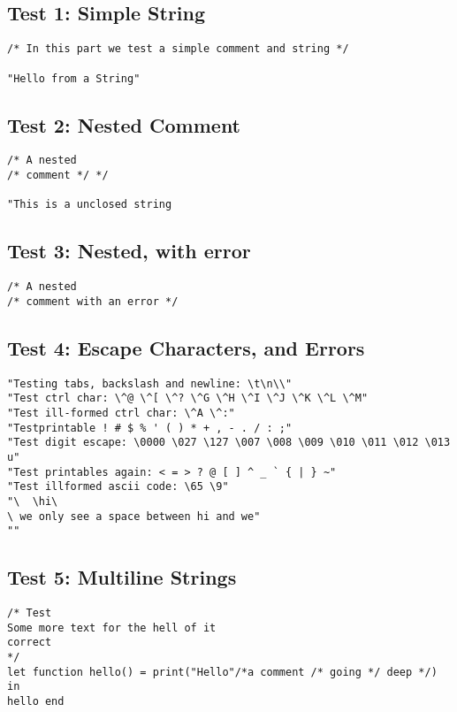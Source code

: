 \documentclass{article}
\begin{document}
\subsection{Test 1: Simple String}
\begin{lstlisting}[frame=single]
/* In this part we test a simple comment and string */

"Hello from a String"
\end{lstlisting}


\subsection{Test 2: Nested Comment}
\begin{lstlisting}[frame=single]
/* A nested
/* comment */ */

"This is a unclosed string
\end{lstlisting}

\subsection{Test 3: Nested, with error}
\begin{lstlisting}[frame=single]
/* A nested
/* comment with an error */ 

\end{lstlisting}

\subsection{Test 4: Escape Characters, and Errors}
\begin{lstlisting}[frame=single]
"Testing tabs, backslash and newline: \t\n\\"
"Test ctrl char: \^@ \^[ \^? \^G \^H \^I \^J \^K \^L \^M"
"Test ill-formed ctrl char: \^A \^:"
"Testprintable ! # $ % ' ( ) * + , - . / : ;"
"Test digit escape: \0000 \027 \127 \007 \008 \009 \010 \011 \012 \013 u"
"Test printables again: < = > ? @ [ ] ^ _ ` { | } ~"
"Test illformed ascii code: \65 \9"
"\	\hi\
\ we only see a space between hi and we"
""
\end{lstlisting}

\subsection{Test 5: Multiline Strings}
\begin{lstlisting}[frame=single]
/* Test 
Some more text for the hell of it
correct
*/
let function hello() = print("Hello"/*a comment /* going */ deep */) in 
hello end
\end{lstlisting}
\end{document}
